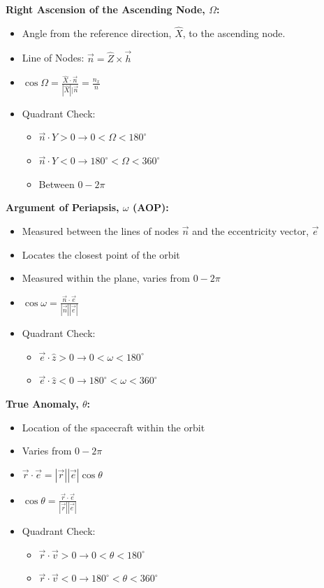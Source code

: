 \documentclass{article}
\begin{document}
\begin{multicols*}{3}
    \textbf{Right Ascension of the Ascending Node, $\Omega$:}
    \begin{itemize}
        \item Angle from the reference direction, $\hat{X}$, to the ascending node.
        \item Line of Nodes: $\vec{n}=\hat{Z}\times\vec{h}$
        \item $\cos{\Omega}=\frac{\hat{X}\cdot\vec{n}}{|\hat{X}||\vec{n}}=\frac{n_x}{n}$
        \item Quadrant Check:
            \begin{itemize}
                \item $\vec{n}\cdot\hat{Y}>0\rightarrow 0 < \Omega < 180^\circ$
                \item $\vec{n}\cdot\hat{Y}<0\rightarrow 180^\circ < \Omega < 360^\circ$
                \item Between $0-2\pi$
            \end{itemize}
    \end{itemize}

    \textbf{Argument of Periapsis, $\omega$ (AOP):}
    \begin{itemize}
        \item Measured between the lines of nodes $\vec{n}$ and the eccentricity vector, $\vec{e}$
        \item Locates the closest point of the orbit
        \item Measured within the plane, varies from $0-2\pi$
        \item $\cos{\omega}=\frac{\vec{n}\cdot\vec{e}}{|\vec{n}||\vec{e}|}$
        \item Quadrant Check:
            \begin{itemize}
                \item $\vec{e}\cdot\hat{z}>0\rightarrow 0<\omega<180^\circ$
                \item $\vec{e}\cdot\hat{z}<0\rightarrow 180^\circ<\omega<360^\circ$
            \end{itemize}
    \end{itemize}
    \vspace{1cm}
    \textbf{True Anomaly, $\theta$:}
    \begin{itemize}
        \item Location of the spacecraft within the orbit
        \item Varies from $0-2\pi$
        \item $\vec{r}\cdot\vec{e}=|\vec{r}||\vec{e}|\cos{\theta}$
        \item $\cos{\theta}=\frac{\vec{r}\cdot\vec{e}}{|\vec{r}||\vec{e}|}$
        \item Quadrant Check:
            \begin{itemize}
                \item $\vec{r}\cdot\vec{v}>0\rightarrow 0 < \theta < 180^\circ$
                \item $\vec{r}\cdot\vec{v}<0\rightarrow 180^\circ<\theta<360^\circ$
            \end{itemize}
    \end{itemize}


\end{multicols*}
\end{document}
